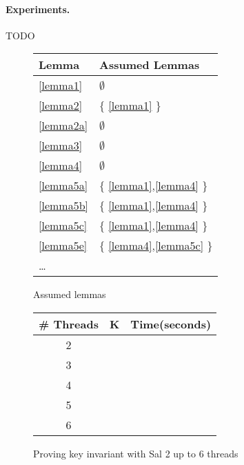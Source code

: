 \paragraph{Experiments.} TODO


\begin{figure}[t]
  \begin{center}
    \begin{tabular}{|l|l|}
      \hline
      \textsf{Lemma} & \textsf{Assumed Lemmas} \\
      \hline     
      \ref{lemma1}   & $\emptyset$  \\
      \ref{lemma2}   & $\{$ \ref{lemma1} $\}$ \\
      \ref{lemma2a}  & $\emptyset$  \\
      \ref{lemma3}   & $\emptyset$  \\
      \ref{lemma4}   & $\emptyset$  \\
      \ref{lemma5a}  & $\{$ \ref{lemma1},\ref{lemma4} $\}$ \\
      \ref{lemma5b}  & $\{$ \ref{lemma1},\ref{lemma4} $\}$ \\
      \ref{lemma5c}  & $\{$ \ref{lemma1},\ref{lemma4} $\}$ \\
      \ref{lemma5e}  & $\{$ \ref{lemma4},\ref{lemma5c} $\}$ \\
      \ldots & \\
      \hline 
    \end{tabular}
    \caption{Assumed lemmas}
    \label{lemma-dependencies}
    \end{center}
\end{figure}


\begin{figure}[t]
  \begin{center}
    \begin{tabular}{|c|l|l|}
      \hline
      \textsf{\# Threads} & \textsf{K} & \textsf{Time(seconds)} \\
      \hline
      2 & & \\
      3 & & \\
      4 & & \\
      5 & & \\
      6 & &  \\
      \hline 
    \end{tabular}
    \caption{Proving key invariant with Sal 2 up to 6 threads}
    \label{sal-results}
    \end{center}
\end{figure}


